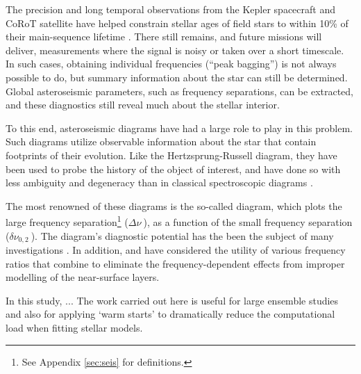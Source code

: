 \documentclass[a4paper,fleqn,usenatbib,useAMS]{mnras}
\newcommand{\Dnu}{\ensuremath{\Delta\nu \ }}
\newcommand{\dnu}{\ensuremath{\delta\nu_{0,2} \ }}
\begin{document}
The precision and long temporal observations from the Kepler spacecraft and CoRoT satellite have helped constrain stellar ages of field stars to within 10\% of their main-sequence lifetime \citep{2015MNRAS.452.2127S}. There still remains, and future missions will deliver, measurements where the signal is noisy or taken over a short timescale. In such cases, obtaining individual frequencies (``peak bagging'') is not always possible to do, but summary information about the star can still be determined. Global asteroseismic parameters, such as frequency separations, can be extracted, and these diagnostics still reveal much about the stellar interior. 

To this end, asteroseismic diagrams have had a large role to play in this problem. Such diagrams utilize observable information about the star that contain footprints of their evolution. Like the Hertzsprung-Russell diagram, they have been used to probe the history of the object of interest, and have done so with less ambiguity and degeneracy than in classical spectroscopic diagrams \citep{2013MNRAS.429.3645S}. 

The most renowned of these diagrams is the so-called \citet{1984srps.conf...11C} diagram, which plots the large frequency separation\footnote{See Appendix \ref{sec:seis} for definitions.} (\Dnu), as a function of the small frequency separation (\dnu). The diagram's diagnostic potential has the been the subject of many investigations \citep[see e.g.][]{1987Natur.326..257G, 2009A&A...508..849G, 2011ApJ...743..161W}. In addition, \citet{2005A&A...441.1079M} and \citet{2014A&A...569A..21L} have considered the utility of various frequency ratios \citep{2003A&A...411..215R, 2005MNRAS.356..671O} that combine to eliminate the frequency-dependent effects from improper modelling of the near-surface layers. 

In this study, ... The work carried out here is useful for large ensemble studies and also for applying `warm starts' to dramatically reduce the computational load when fitting stellar models.  

\end{document}
